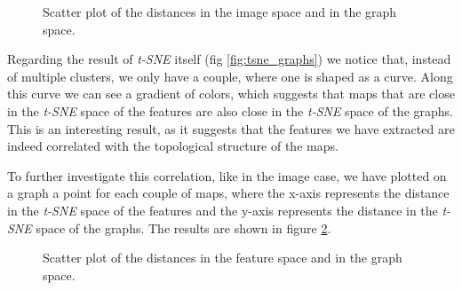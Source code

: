 \begin{figure}[hbt!]
    \centering
    \qquad
    \qquad
    \qquad
    \qquad
    \caption{Scatter plot of the distances in the image space and in the graph space.}
    \label{fig:dist_graphs_images}
\end{figure}

Regarding the result of \textit{t-SNE} itself (fig \cref{fig:tsne_graphs}) we notice that, instead of multiple clusters, we only have a couple, where one is shaped as a curve. Along this curve we can see a gradient of colors, which suggests that maps that are close in the \textit{t-SNE} space of the features are also close in the \textit{t-SNE} space of the graphs. This is an interesting result, as it suggests that the features we have extracted are indeed correlated with the topological structure of the maps.

To further investigate this correlation, like in the image case, we have plotted on a graph a point for each couple of maps, where the x-axis represents the distance in the \textit{t-SNE} space of the features and the y-axis represents the distance in the \textit{t-SNE} space of the graphs. The results are shown in figure \cref{fig:tsne_distance_graphs}.  

\begin{figure}[hbt!]
    \centering
    \qquad
    \qquad
    \qquad
    \qquad
    \caption{Scatter plot of the distances in the feature space and in the graph space.}
    \label{fig:tsne_distance_graphs}
\end{figure}

